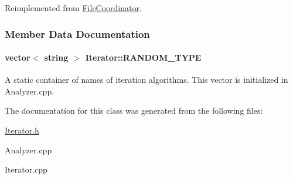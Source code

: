 Reimplemented from \hyperlink{class_file_coordinator_a2d9b661099244a87012a4f7de9d3a120}{File\+Coordinator}.



\subsubsection{Member Data Documentation}
\hypertarget{class_iterator_ad223ae399ddcff5d47b4991cf981932c}{
\paragraph[{R\+A\+N\+D\+O\+M\+\_\+\+T\+Y\+P\+E}]{\setlength{\rightskip}{0pt plus 5cm}vector$<$ string $>$ Iterator\+::\+R\+A\+N\+D\+O\+M\+\_\+\+T\+Y\+P\+E\hspace{0.3cm}{\ttfamily [static]}}}\label{class_iterator_ad223ae399ddcff5d47b4991cf981932c}
A static container of names of iteration algorithms. This vector is initialized in Analyzer.\+cpp. 

The documentation for this class was generated from the following files\+:\begin{DoxyCompactItemize}
\item 
\hyperlink{_iterator_8h}{Iterator.\+h}\item 
Analyzer.\+cpp\item 
Iterator.\+cpp\end{DoxyCompactItemize}
